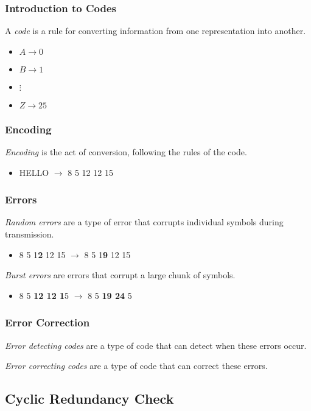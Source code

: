\documentclass{beamer}
\begin{document}
\begin{frame}
	\frametitle{Introduction to Codes}
	A \textit{code} is a rule for converting information from one representation into another.
	
	\begin{itemize}
		\item $A \rightarrow 0$
		\item $B \rightarrow 1$
		\item $ \vdots $
		\item $Z \rightarrow 25$
	\end{itemize}
\end{frame}

\begin{frame}
	\frametitle{Encoding}
	\textit{Encoding} is the act of conversion, following the rules of the code.
	
	\begin{itemize}
		\item HELLO $\rightarrow$ 8 5 12 12 15
	\end{itemize}
\end{frame}

\begin{frame}
	\frametitle{Errors}
	\textit{Random errors} are a type of error that corrupts individual symbols during transmission.
	\begin{itemize}
		\item 8 5 1\textbf{2} 12 15 $\rightarrow$ 8 5 1\textbf{9} 12 15
	\end{itemize}
	
	\textit{Burst errors} are errors that corrupt a large chunk of symbols.
	\begin{itemize}
		\item 8 5 \textbf{12 12 1}5 $\rightarrow$ 8 5 \textbf{19 24 }5
	\end{itemize}
\end{frame}

\begin{frame}
	\frametitle{Error Correction}
	\textit{Error detecting codes} are a type of code that can detect when these errors occur.
	
	\textit{Error correcting codes} are a type of code that can correct these errors.
\end{frame}

\subsection{Cyclic Redundancy Check}
\end{document}
